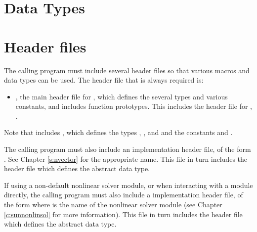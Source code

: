 \section{Data Types}\label{s:types}


\section{Header files}\label{ss:header_sim}
The calling program must include several header files so that various macros
and data types can be used. The header file that is always required is:
\begin{itemize}
\item  {},
  the main header file for {\cvodes}, which defines the several
  types and various constants, and includes function prototypes.  This
  includes the header file for {\cvls}, \\ \noindent {}.
\end{itemize}
Note that  includes ,
which defines the types , , and 
and the constants  and .

The calling program must also include an {\nvector} implementation header file,
of the form \\ \noindent {}.  See Chapter \ref{s:nvector}
for the appropriate name.  This file in turn includes the header file
 which defines the abstract  data type.

If using a non-default nonlinear solver module, or when interacting
with a {\sunnonlinsol} module directly, the calling program must also
include a {\sunnonlinsol} implementation header file, of the form
 where \id{***} is the name of the
nonlinear solver module (see Chapter \ref{c:sunnonlinsol} for more
information). This file in turn includes the header file
 which defines the abstract
 data type.

